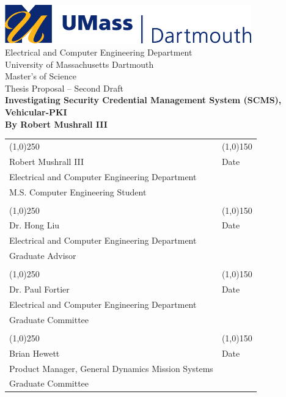 \documentclass {article}
\begin{document}
\begin{titlepage}
	\centering
	\includegraphics[width=0.8\textwidth]{images/umd_logo.jpg} \\ \bigskip
	\LARGE{Electrical and Computer Engineering Department \\University of Massachusetts Dartmouth}\\
	\bigskip 
	\LARGE{Master's of Science \\ Thesis Proposal -- Second Draft} \\
	\bigskip 
	\Huge{\bf Investigating Security Credential Management System (SCMS), Vehicular-PKI} \\ \medskip
	\LARGE{\bf By Robert Mushrall III}

	\vfill
	\begin{table}[!hb]
		\centering
		\begin{tabular}{ l l }
			\line(1,0){250} & \line(1,0){150} \\
			\small{Robert Mushrall III}  & \small{Date} \\
			\small{Electrical and Computer Engineering Department} \\
			\small{M.S. Computer Engineering Student} & \\
			\vspace{.3cm} \\
			\line(1,0){250} & \line(1,0){150} \\
			\small{Dr. Hong Liu} & \small{Date} \\
			\small{Electrical and Computer Engineering Department} \\
			\small{Graduate Advisor} & \\
			\vspace{.3cm} \\
			\line(1,0){250} & \line(1,0){150} \\
			\small{Dr. Paul Fortier} & \small{Date} \\
			\small{Electrical and Computer Engineering Department} \\
			\small{Graduate Committee} & \\
			\vspace{.3cm} \\
			\line(1,0){250} & \line(1,0){150} \\
			\small{Brian Hewett} & \small{Date} \\
			\small{Product Manager, General Dynamics Mission Systems} \\
			\small{Graduate Committee} & \\
		\end{tabular}
	\end{table}
	\thispagestyle{empty}
\end{titlepage}
\setcounter{page}{2}
\end{document}
